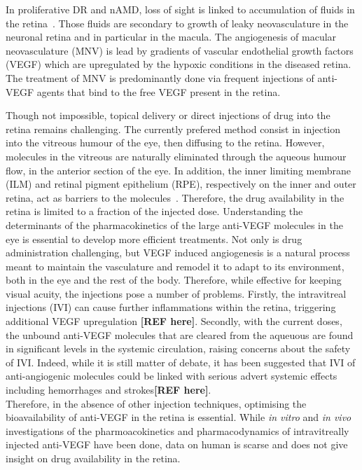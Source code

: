 \documentclass[12pt,a4paper]{article}
\begin{document}
In proliferative DR and nAMD, loss of sight is linked to accumulation of fluids in the retina~\cite{Waldstein_2016, Roberts_2020}.
Those fluids are secondary to growth of leaky neovasculature in the neuronal retina and in particular in the macula.
The angiogenesis of macular neovasculature (MNV) is lead by gradients of vascular endothelial growth factors (VEGF) which are upregulated by the hypoxic conditions in the diseased retina.
The treatment of MNV is predominantly done via frequent injections of anti-VEGF agents that bind to the free VEGF present in the retina.

Though not impossible, topical delivery or direct injections of drug into the retina remains challenging.
The currently prefered method consist in injection into the vitreous humour of the eye, then diffusing to the retina.
However, molecules in the vitreous are naturally eliminated through the aqueous humour flow, in the anterior section of the eye.
In addition, the inner limiting membrane (ILM) and retinal pigment epithelium (RPE), respectively on the inner and outer retina, act as barriers to the molecules~\cite{park_intraocular_2015}.
Therefore, the drug availability in the retina is limited to a fraction of the injected dose.
Understanding the determinants of the pharmacokinetics of the large anti-VEGF molecules in the eye is essential to develop more efficient treatments.
Not only is drug administration challenging, but VEGF induced angiogenesis is a natural process meant to maintain the vasculature and remodel it to adapt to its environment, both in the eye and the rest of the body.
Therefore, while effective for keeping visual acuity, the injections pose a number of problems.
Firstly, the intravitreal injections (IVI) can cause further inflammations within the retina, triggering additional VEGF upregulation \textbf{[REF here]}.
Secondly, with the current doses, the unbound anti-VEGF molecules that are cleared from the aqueuous are found in significant levels in the systemic circulation, raising concerns about the safety of IVI.
Indeed, while it is still matter of debate, it has been suggested that IVI of anti-angiogenic molecules could be linked with serious advert systemic effects including hemorrhages and strokes\textbf{[REF here]}. \\
Therefore, in the absence of other injection techniques, optimising the bioavailability of anti-VEGF in the retina is essential.
While \textit{in vitro} and \textit{in vivo} investigations of the pharmoacokinetics and pharmacodynamics of intravitreally injected anti-VEGF have been done, data on human is scarse and does not give insight on drug availability in the retina.
\end{document}
